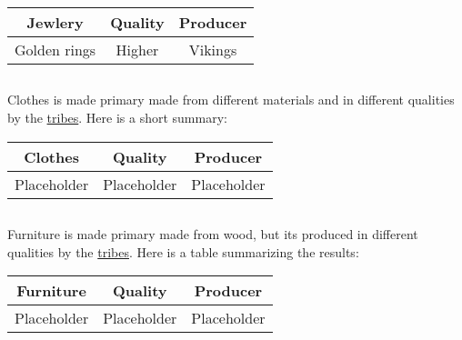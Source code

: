 \begin{longtable}{ccc}
	\toprule
	\Gls*{Jewlery} & Quality & Producer      \\
	\midrule
	Golden rings   & Higher  & \Gls{Vikings} \\ \bottomrule
\end{longtable}

\subsection{}\label{ch:Goods:Merchandise:Clothes}

\Gls{Clothes} is made primary made from different materials and in different qualities by the
\hyperref[ch:Tribes]{tribes}. Here is a short summary:

\begin{longtable}{ccc}
	\toprule
	\Gls*{Clothes} & Quality     & Producer    \\
	\midrule
	Placeholder    & Placeholder & Placeholder \\
	\bottomrule
\end{longtable}

\subsection{}\label{ch:Goods:Merchandise:Furniture}

\Gls{Furniture} is made primary made from wood, but its produced in different qualities by the
\hyperref[ch:Tribes]{tribes}. Here is a table summarizing the results:

\begin{longtable}{ccc}
	\toprule
	\Gls{Furniture} & Quality     & Producer    \\
	\midrule
	Placeholder     & Placeholder & Placeholder \\
	\bottomrule
\end{longtable}

